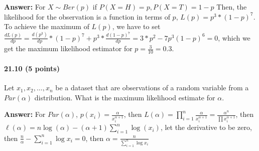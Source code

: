 \documentclass{article} %
\begin{document}
{\bf Answer:}  For $X\sim Ber(p)$ if $P(X=H) = p, P(X=T) = 1-p$ 
Then, the likelihood for the observation is a function in terms of $p$, $L(p) = p^3*(1-p)^7$. To achieve the maximum of $L(p)$, we have to set $\frac{dL(p)}{dp} = \frac{d(p^3)}{dp}*(1-p)^7 + p^3*\frac{d(1-p)^7}{dp} = 3*p^2 - 7p^3(1-p)^6 = 0$, which we get the maximum likelihood estimator for $p = \frac{3}{10} = 0.3$. 

\paragraph*{21.10 (5 points)} Let $x_1, x_2, \ldots, x_n$ be a dataset that are observations of a random variable from a $Par(\alpha)$ distribution. What is the maximum likelihood estimate for $\alpha$. 

{\bf Answer:} For $Par(\alpha)$, $p(x_i) = \frac{\alpha}{x_i^{\alpha+1}}$, then 
$L(\alpha) = \prod_{i=1}^n \frac{\alpha}{x_i^{\alpha+1}} = \frac{\alpha^n}{\prod x_i^{\alpha+1}}$, then 
$\ell(\alpha) = n\log(\alpha) - (\alpha+1)\sum_{i=1}^n \log(x_i)$, let the derivative to be zero, then 
$\frac{n}{\alpha} - \sum_{i=1}^n \log x_i = 0$, then $\alpha = \frac{n}{\sum_{i=1}^n \log x_i}$
\end{document}

